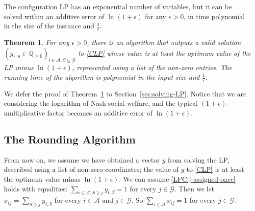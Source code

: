 \documentclass[10pt,a4paper]{article}
\newtheorem{theorem}{Theorem}[section]
\theoremstyle{definition}
\theoremstyle{plain}
\newcommand\calA{{\mathcal{A}}}
\newcommand\calG{{\mathcal{G}}}
\newcommand{\Q}{{\mathbb{Q}}}
\begin{document}
The configuration LP has an exponential number of variables, but it can be solved within an additive error of $\ln(1 + \epsilon)$ for any $\epsilon > 0$, in time polynomial in the size of the instance  and $\frac1\epsilon$. 
\begin{theorem}
    \label{thm:solve-lp}
    For any $\epsilon > 0$, there is an algorithm that     
    outputs a valid solution $(y_{i, S} \in \Q_{\geq 0})_{i \in \calA, S \subseteq \calG}$ to \eqref{CLP} whose value is at least the optimum value of the LP minus $\ln(1+\epsilon)$, represented using a list of the non-zero entries. The running time of the algorithm is polynomial in the input size and $\frac1\epsilon$.
\end{theorem}
We defer the proof of Theorem~\ref{thm:solve-lp} to Section~\ref{sec:solving-LP}. 
Notice that we are considering the logarithm of Nash social welfare, and the typical $(1+\epsilon)$-multiplicative factor becomes an additive error of $\ln(1 + \epsilon)$. 


\subsection{The Rounding Algorithm} \label{sec:rounding}
    From now on, we assume we have obtained a vector $y$ from solving the LP, described using a list of non-zero coordinates; the value of $y$ to \eqref{CLP} is at least the optimum value minus $\ln(1+\epsilon)$. We can assume \eqref{LPC:j-assigned-once} holds with equalities: $\sum_{i \in \calA, S \ni j}y_{i, S} = 1$ for every $j \in \calG$. Then we let $x_{ij} = \sum_{S \ni j} y_{i, S}$ for every $i \in \calA$ and $j \in \calG$. So $\sum_{i \in \calA} x_{ij} = 1$ for every $j \in \calG$.
\end{document}
